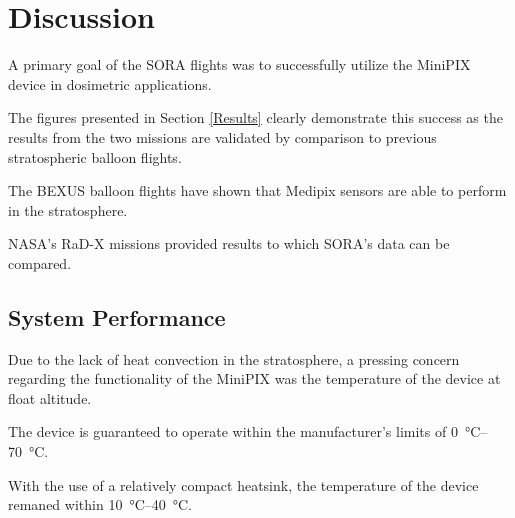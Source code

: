 
\section{Discussion}

\label{Discussion}





A primary goal of the SORA flights was to successfully utilize the MiniPIX device in dosimetric applications.

The figures presented in Section \ref{Results} clearly demonstrate this success as the results from the two missions are validated by comparison to previous stratospheric balloon flights.

The BEXUS \cite{bexus} balloon flights have shown that Medipix sensors are able to perform in the stratosphere.

NASA's RaD-X missions \cite{rad-x} provided results to which SORA's data can be compared.



\subsection{System Performance}



Due to the lack of heat convection in the stratosphere, a pressing concern regarding the functionality of the MiniPIX was the temperature of the device at float altitude. 

The device is guaranteed to operate within the manufacturer's limits of \SIrange{0}{70}{\celsius}.

With the use of a relatively compact heatsink, the temperature of the device remaned within \SIrange{10}{40}{\celsius}.

